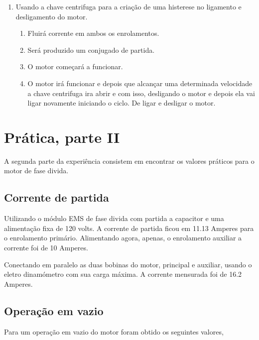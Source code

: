 \documentclass[paper=a4, fontsize=11pt]{article}
\begin{document}
\begin{enumerate}
\begin{enumerate}
        \end{enumerate}

\item Usando a chave centrifuga para a criação de uma histerese no ligamento
        e desligamento do motor.

        \begin{enumerate}
            \item Fluirá corrente em ambos os enrolamentos.
            \item Será produzido um conjugado de partida.
            \item O motor começará a funcionar.
            \item O motor irá funcionar e depois que alcançar uma determinada velocidade a chave centrifuga ira abrir e com isso, desligando o motor e depois ela vai ligar novamente iniciando o ciclo. De ligar e desligar o motor.
        \end{enumerate}

\end{enumerate}


\section{Prática, parte II}

A segunda parte da experiência consistem em encontrar
os valores práticos para o motor de fase divida.

\subsection{Corrente de partida}

Utilizando o módulo EMS de fase divida com partida a capacitor
e uma alimentação fixa de 120 volts. A corrente de partida
ficou em 11.13 Amperes para o enrolamento primário. Alimentando
agora, apenas, o enrolamento auxiliar a corrente foi de 10 Amperes.

Conectando em paralelo as duas bobinas do motor, principal e 
auxiliar, usando o eletro dinamómetro com sua carga máxima. A
corrente mensurada foi de 16.2 Amperes.

\subsection{Operação em vazio}

Para um operação em vazio do motor foram obtido os seguintes 
valores, 
\end{document}

